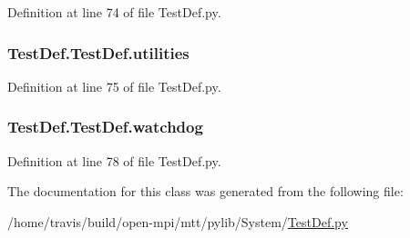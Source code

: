 Definition at line 74 of file Test\-Def.\-py.

\hypertarget{class_test_def_1_1_test_def_a0b9ea6f06c02401ad62e06c4cfd80bd2}{
\subsubsection[{utilities}]{\setlength{\rightskip}{0pt plus 5cm}Test\-Def.\-Test\-Def.\-utilities}}\label{class_test_def_1_1_test_def_a0b9ea6f06c02401ad62e06c4cfd80bd2}


Definition at line 75 of file Test\-Def.\-py.

\hypertarget{class_test_def_1_1_test_def_a40da46aa95507cffa798cb152fa69e27}{
\subsubsection[{watchdog}]{\setlength{\rightskip}{0pt plus 5cm}Test\-Def.\-Test\-Def.\-watchdog}}\label{class_test_def_1_1_test_def_a40da46aa95507cffa798cb152fa69e27}


Definition at line 78 of file Test\-Def.\-py.



The documentation for this class was generated from the following file\-:\begin{DoxyCompactItemize}
\item 
/home/travis/build/open-\/mpi/mtt/pylib/\-System/\hyperlink{_test_def_8py}{Test\-Def.\-py}\end{DoxyCompactItemize}
